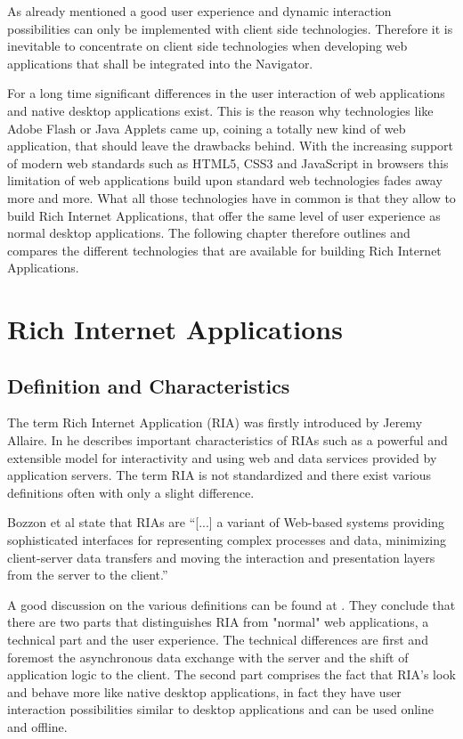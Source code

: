 As already mentioned a good user experience and dynamic interaction possibilities can only be implemented with client side technologies. Therefore it is inevitable to concentrate on client side technologies when developing web applications that shall be integrated into the Navigator.

For a long time significant differences in the user interaction of web applications and native desktop applications exist.
This is the reason why technologies like Adobe Flash or Java Applets came up, coining a totally new kind of web application, that should leave the drawbacks behind. 
With the increasing support of modern web standards such as HTML5, CSS3 and JavaScript in browsers this limitation of web applications build upon standard web technologies fades away more and more. 
What all those technologies have in common is that they allow to build Rich Internet Applications, that offer the same level of user experience as normal desktop applications. 
The following chapter therefore outlines and compares the different technologies that are available for building Rich Internet Applications.

\section{Rich Internet Applications}

\subsection{Definition and Characteristics}

The term Rich Internet Application (RIA) was firstly introduced by Jeremy Allaire.
In \autocite[]{allaire_ria} he describes important characteristics of RIAs such as a powerful and extensible model for interactivity and using web and data services provided by application servers.
The term RIA is not standardized and there exist various definitions often with only a slight difference.

Bozzon et al state that RIAs are  \enquote{[...] a variant of Web-based systems providing sophisticated interfaces for representing complex processes and data, minimizing client-server data transfers and moving the interaction and presentation layers from the server to the client.} \autocite[]{ria-definition-1}
 
A good discussion on the various definitions can be found at \autocite[]{ria-state-of-the-art}.
They conclude that there are two parts that distinguishes RIA from "normal" web applications, a technical part and the user experience.
The technical differences are first and foremost the asynchronous data exchange with the server and the shift of application logic to the client.
The second part comprises the fact that RIA's look and behave more like native desktop applications, in fact they have user interaction possibilities similar to desktop applications and can be used online and offline.
 
